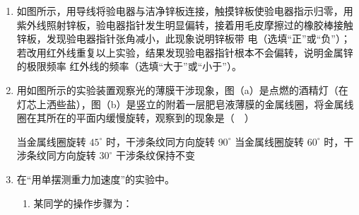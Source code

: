 \documentclass[\gkver]{gaokaozhenti}
\begin{document}
\begin{enumerate}
\item
如图所示，用导线将验电器与洁净锌板连接，触摸锌板使验电器指示归零，用紫外线照射锌板，验电器指针发生明显偏转，接着用毛皮摩擦过的橡胶棒接触锌板，发现验电器指针张角减小，此现象说明锌板带  电（选填“正”或“负”）；若改用红外线重复以上实验，结果发现验电器指针根本不会偏转，说明金属锌的极限频率  红外线的频率（选填“大于”或“小于”）。

\onepicture[align=right, w=5.50cm]{}



\item
用如图所示的实验装置观察光的薄膜干涉现象，图（a）是点燃的酒精灯（在灯芯上洒些盐），图（b）是竖立的附着一层肥皂液薄膜的金属线圈，将金属线圈在其所在的平面内缓慢旋转，观察到的现象是（　）

\onepicture[w=8.00cm]{}

{当金属线圈旋转 $45^{\circ}$ 时，干涉条纹同方向旋转 $90^{\circ}$}
{当金属线圈旋转 $60^{\circ}$ 时，干涉条纹同方向旋转 $30^{\circ}$}
{干涉条纹保持不变}



\item
在“用单摆测重力加速度”的实验中。

\begin{enumerate}
	\item
	某同学的操作步骤为：
	

\end{enumerate}
\end{enumerate}
\end{document}

